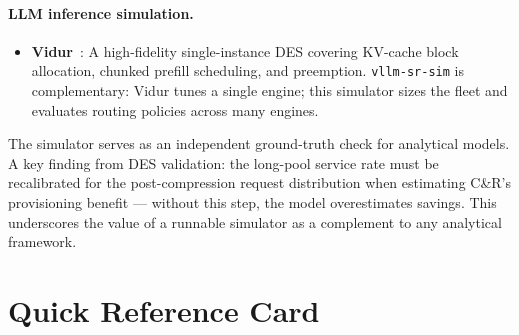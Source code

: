 \documentclass[11pt,a4paper]{article}
\begin{document}
\paragraph{LLM inference simulation.}
\begin{itemize}[nosep]
  \item \textbf{Vidur}~\citep{vidur2024}:
    A high-fidelity single-instance DES covering KV-cache block
    allocation, chunked prefill scheduling, and preemption.
    \texttt{vllm-sr-sim} is complementary: Vidur tunes a single
    engine; this simulator sizes the fleet and evaluates routing policies
    across many engines.
\end{itemize}

The simulator serves as an independent ground-truth check for analytical
models.  A key finding from DES validation: the long-pool service rate
must be recalibrated for the post-compression request distribution when
estimating C\&R's provisioning benefit --- without this step, the model
overestimates savings.  This underscores the value of a runnable
simulator as a complement to any analytical framework.

\section{Quick Reference Card}
\label{sec:quickref}
\end{document}

